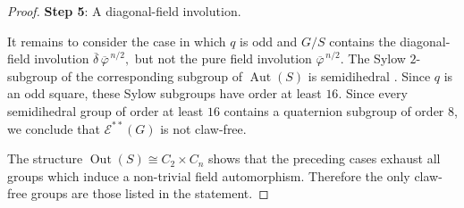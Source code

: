 \documentclass[preprint,11pt]{elsarticle}
\begin{document}
\begin{proof}
	\medskip
	\noindent
	\textbf{Step 5}: A diagonal-field involution.
	
	It remains to consider the case in which $q$ is odd and $G/S$
	contains the diagonal-field involution
$
	\overline{\delta}\,
	\overline{\varphi}^{\,n/2},
$
	but not the pure field involution
$
	\overline{\varphi}^{\,n/2}.$
%
The Sylow $2$-subgroup of the corresponding subgroup of $\operatorname{Aut}(S)$ is
 semidihedral \cite[Lemma 2.3]{goren}.
	Since $q$ is an odd square, these Sylow subgroups have order at
	least $16$. Since every semidihedral group of order at least
	$16$ contains a quaternion subgroup of order $8$, we conclude that $\mathcal E^{**}(G)$ is not claw-free.

\medskip

	The structure
	$
	\operatorname{Out}(S)
	\cong C_2\times C_n
$
	shows that the preceding cases exhaust all groups which induce
	a non-trivial field automorphism.  Therefore the only
	claw-free groups are those listed in the statement.
\end{proof}
\end{document}
